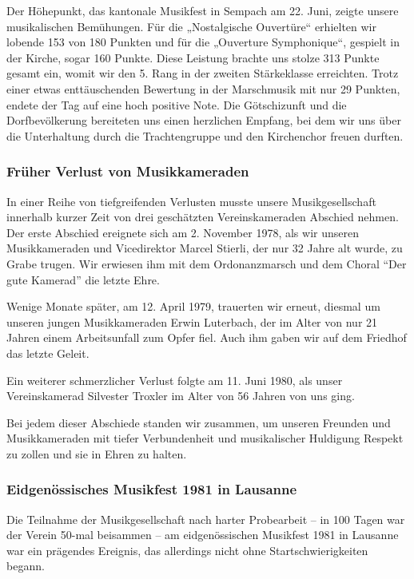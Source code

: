 \begin{history}
    Der Höhepunkt, das kantonale Musikfest in Sempach am 22. Juni, zeigte unsere
    musikalischen Bemühungen. Für die „Nostalgische Ouvertüre“ erhielten wir
    lobende 153 von 180 Punkten und für die „Ouverture Symphonique“, gespielt in
    der Kirche, sogar 160 Punkte. Diese Leistung brachte uns stolze 313 Punkte
    gesamt ein, womit wir den 5. Rang in der zweiten Stärkeklasse erreichten.
    Trotz einer etwas enttäuschenden Bewertung in der Marschmusik mit nur 29
    Punkten, endete der Tag auf eine hoch positive Note. Die Götschizunft und
    die Dorfbevölkerung bereiteten uns einen herzlichen Empfang, bei dem wir uns
    über die Unterhaltung durch die Trachtengruppe und den Kirchenchor freuen
    durften.

    \subsubsection*{Früher Verlust von Musikkameraden}
    In einer Reihe von tiefgreifenden Verlusten musste unsere Musikgesellschaft
    innerhalb kurzer Zeit von drei geschätzten Vereinskameraden Abschied nehmen.
    Der erste Abschied ereignete sich am 2. November 1978, als wir unseren
    Musikkameraden und Vicedirektor Marcel Stierli, der nur 32 Jahre alt wurde,
    zu Grabe trugen. Wir erwiesen ihm mit dem Ordonanzmarsch und dem Choral
    \enquote{Der gute Kamerad} die letzte Ehre.

    Wenige Monate später, am 12. April 1979, trauerten wir erneut, diesmal um
    unseren jungen Musikkameraden Erwin Luterbach, der im Alter von nur 21
    Jahren einem Arbeitsunfall zum Opfer fiel. Auch ihm gaben wir auf dem
    Friedhof das letzte Geleit.

    Ein weiterer schmerzlicher Verlust folgte am 11. Juni 1980, als unser
    Vereinskamerad Silvester Troxler im Alter von 56 Jahren von uns ging.

    Bei jedem dieser Abschiede standen wir zusammen, um unseren Freunden und
    Musikkameraden mit tiefer Verbundenheit und musikalischer Huldigung Respekt
    zu zollen und sie in Ehren zu halten.

    \subsubsection*{Eidgenössisches Musikfest 1981 in Lausanne}

    Die Teilnahme der Musikgesellschaft nach harter Probearbeit -- in 100 Tagen
    war der Verein 50-mal beisammen -- am eidgenössischen Musikfest 1981 in
    Lausanne war ein prägendes Ereignis, das allerdings nicht ohne
    Startschwierigkeiten begann.


\end{history}
